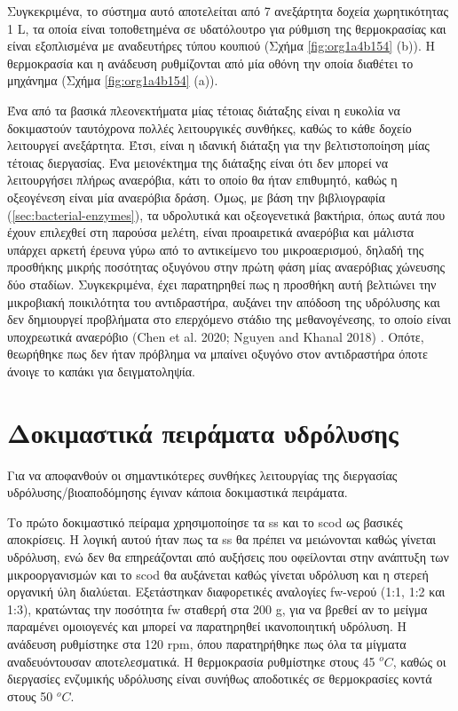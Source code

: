 \documentclass[11pt]{report}
\makeatletter
\newcommand{\citeprocitem}[2]{\hyper@linkstart{cite}{citeproc_bib_item_#1}#2\hyper@linkend}
\makeatother
\begin{document}
Συγκεκριμένα, το σύστημα αυτό αποτελείται από 7 ανεξάρτητα δοχεία χωρητικότητας 1 L, τα οποία είναι τοποθετημένα σε υδατόλουτρο για ρύθμιση της θερμοκρασίας και είναι εξοπλισμένα με αναδευτήρες τύπου κουπιού (Σχήμα \ref{fig:org1a4b154} (b)). Η θερμοκρασία και η ανάδευση ρυθμίζονται από μία οθόνη την οποία διαθέτει το μηχάνημα (Σχήμα \ref{fig:org1a4b154} (a)).  

Ένα από τα βασικά πλεονεκτήματα μίας τέτοιας διάταξης είναι η ευκολία να δοκιμαστούν ταυτόχρονα πολλές λειτουργικές συνθήκες, καθώς το κάθε δοχείο λειτουργεί ανεξάρτητα. Έτσι, είναι η ιδανική διάταξη για την βελτιστοποίηση μίας τέτοιας διεργασίας. Ένα μειονέκτημα της διάταξης είναι ότι δεν μπορεί να λειτουργήσει πλήρως αναερόβια, κάτι το οποίο θα ήταν επιθυμητό, καθώς η οξεογένεση είναι μία αναερόβια δράση. Όμως, με βάση την βιβλιογραφία (\autoref{sec:bacterial-enzymes}), τα υδρολυτικά και οξεογενετικά βακτήρια, όπως αυτά που έχουν επιλεχθεί στη παρούσα μελέτη, είναι προαιρετικά αναερόβια και μάλιστα υπάρχει αρκετή έρευνα γύρω από το αντικείμενο του μικροαερισμού, δηλαδή της προσθήκης μικρής ποσότητας οξυγόνου στην πρώτη φάση μίας αναερόβιας χώνευσης δύο σταδίων. Συγκεκριμένα, έχει παρατηρηθεί πως η προσθήκη αυτή βελτιώνει την μικροβιακή ποικιλότητα του αντιδραστήρα, αυξάνει την απόδοση της υδρόλυσης και δεν δημιουργεί προβλήματα στο επερχόμενο στάδιο της μεθανογένεσης, το οποίο είναι υποχρεωτικά αναερόβιο (\citeprocitem{13}{Chen et al. 2020}; \citeprocitem{53}{Nguyen and Khanal 2018}) . Οπότε, θεωρήθηκε πως δεν ήταν πρόβλημα να μπαίνει οξυγόνο στον αντιδραστήρα όποτε άνοιγε το καπάκι για δειγματοληψία.

\section{Δοκιμαστικά πειράματα υδρόλυσης}
\label{sec:orgb9478b1}
\label{sec:prep-hydro}

Για να αποφανθούν οι σημαντικότερες συνθήκες λειτουργίας της διεργασίας υδρόλυσης/βιοαποδόμησης έγιναν κάποια δοκιμαστικά πειράματα.

Το πρώτο δοκιμαστικό πείραμα χρησιμοποίησε τα \acrfull{ss} και το \acrfull{scod} ως βασικές αποκρίσεις. Η λογική αυτού ήταν πως τα \acrshort{ss} θα πρέπει να μειώνονται καθώς γίνεται υδρόλυση, ενώ δεν θα επηρεάζονται από αυξήσεις που οφείλονται στην ανάπτυξη των μικροοργανισμών και το \acrshort{scod} θα αυξάνεται καθώς γίνεται υδρόλυση και η στερεή οργανική ύλη διαλύεται. Εξετάστηκαν διαφορετικές αναλογίες \acrshort{fw}-νερού (1:1, 1:2 και 1:3), κρατώντας την ποσότητα \acrshort{fw} σταθερή στα 200 g, για να βρεθεί αν το μείγμα παραμένει ομοιογενές και μπορεί να παρατηρηθεί ικανοποιητική υδρόλυση. Η ανάδευση ρυθμίστηκε στα 120 rpm, όπου παρατηρήθηκε πως όλα τα μίγματα αναδευόντουσαν αποτελεσματικά. Η θερμοκρασία ρυθμίστηκε στους 45 \(^oC\), καθώς οι διεργασίες ενζυμικής υδρόλυσης είναι συνήθως αποδοτικές σε θερμοκρασίες κοντά στους 50 \(^oC\). 
\end{document}

